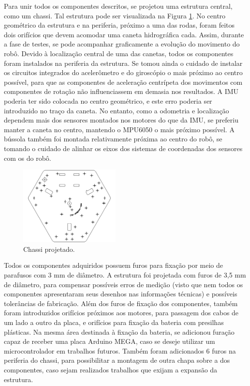 Para unir todos os componentes descritos, se projetou uma estrutura central, como um chassi. Tal estrutura pode ser visualizada na Figura \ref{fig:chassi}. No centro geométrico da estrutura e na periferia, próximo a uma das rodas, foram feitos dois orifícios que devem acomodar uma caneta hidrográfica cada. Assim, durante a fase de testes, se pode acompanhar graficamente a evolução do movimento do robô. Devido à localização central de uma das canetas, todos os componentes foram instalados na periferia da estrutura. Se tomou ainda o cuidado de instalar os circuitos integrados do acelerômetro e do giroscópio o mais próximo ao centro possível, para que as componentes de aceleração centrípeta dos movimentos com componentes de rotação não influenciassem em demasia nos resultados. A IMU poderia ter sido colocada no centro geométrico, e este erro poderia ser introduzido no traço da caneta. No entanto, como a odometria e localização dependem mais dos sensores montados nos motores do que da IMU, se preferiu manter a caneta no centro, mantendo o MPU6050 o mais próximo possível. A bússola também foi montada relativamente próxima ao centro do robô, se tomando o cuidado de alinhar os eixos dos sistemas de coordenadas dos sensores com os do robô.

\begin{figure}[h]
  \centering
  \includegraphics[width = 0.45\textwidth]{imagens/chassidxf}
  \caption{Chassi projetado.}
  \label{fig:chassi}
\end{figure}

Todos os componentes adquiridos possuem furos para fixação por meio de parafusos com 3 mm de diâmetro. A estrutura foi projetada com furos de 3,5 mm de diâmetro, para compensar possíveis erros de medição (visto que nem todos os componentes apresentaram seus desenhos nas informações técnicas) e possíveis tolerâncias de fabricação. Além dos furos de fixação dos componentes, também foram introduzidos orifícios próximos aos motores, para passagem dos cabos de um lado a outro da placa, e orifícios para fixação da bateria com presilhas plásticas. Na mesma área destinada à fixação da bateria, se adicionou furação capaz de receber uma placa Arduino MEGA, caso se deseje utilizar um microcontrolador em trabalhos futuros. Também foram adicionados 6 furos na periferia do chassi, para possibilitar a montagem de outra chapa sobre a dos componentes, caso sejam realizados trabalhos que exijam a expansão da estrutura.

